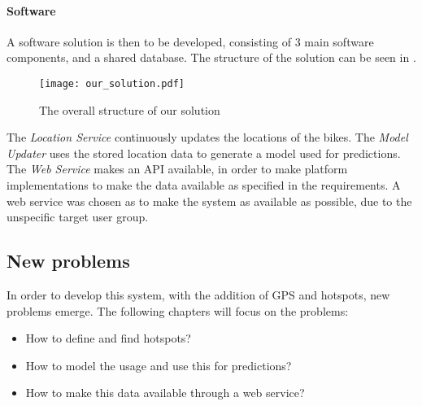 \paragraph{Software}
A software solution is then to be developed, consisting of 3 main software components, and a shared database.
The structure of the solution can be seen in .

\begin{figure}[h]
\texttt{[image: our\_solution.pdf]}
\caption{The overall structure of our solution}
\label{fig:solution_structure}
\end{figure}

The \textit{Location Service} continuously updates the locations of the bikes.
The \textit{Model Updater} uses the stored location data to generate a model used for predictions.
The \textit{Web Service} makes an API available, in order to make platform implementations to make the data available as specified in the requirements.
A web service was chosen as to make the system as available as possible, due to the unspecific target user group.

\subsection{New problems}
In order to develop this system, with the addition of GPS and hotspots, new problems emerge.
The following chapters will focus on the problems:
\begin{itemize}
\item How to define and find hotspots?
\item How to model the usage and use this for predictions?
\item How to make this data available through a web service?
\end{itemize}